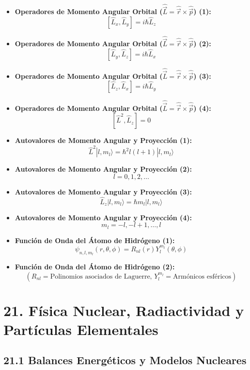 \documentclass[11pt,a4paper]{article}
\begin{document}
\begin{itemize}
  \item \textbf{Operadores de Momento Angular Orbital ($\hat{\vec{L}} = \hat{\vec{r}} \times \hat{\vec{p}}$) (1):}
  \[
    [\hat{L}_x, \hat{L}_y] = i\hbar \hat{L}_z
  \]
  \item \textbf{Operadores de Momento Angular Orbital ($\hat{\vec{L}} = \hat{\vec{r}} \times \hat{\vec{p}}$) (2):}
  \[
    [\hat{L}_y, \hat{L}_z] = i\hbar \hat{L}_x
  \]
  \item \textbf{Operadores de Momento Angular Orbital ($\hat{\vec{L}} = \hat{\vec{r}} \times \hat{\vec{p}}$) (3):}
  \[
    [\hat{L}_z, \hat{L}_x] = i\hbar \hat{L}_y
  \]
  \item \textbf{Operadores de Momento Angular Orbital ($\hat{\vec{L}} = \hat{\vec{r}} \times \hat{\vec{p}}$) (4):}
  \[
    [\hat{L}^2, \hat{L}_z] = 0
  \]
  \item \textbf{Autovalores de Momento Angular y Proyección (1):}
  \[
    \hat{L}^2 |l, m_l\rangle = \hbar^2 l(l + 1)|l, m_l\rangle
  \]
  \item \textbf{Autovalores de Momento Angular y Proyección (2):}
  \[
    l = 0, 1, 2, \dots
  \]
  \item \textbf{Autovalores de Momento Angular y Proyección (3):}
  \[
    \hat{L}_z |l, m_l\rangle = \hbar m_l |l, m_l\rangle
  \]
  \item \textbf{Autovalores de Momento Angular y Proyección (4):}
  \[
    m_l = -l, -l+1, \dots, l
  \]
  \item \textbf{Función de Onda del Átomo de Hidrógeno (1):}
  \[
    \psi_{n, l, m_l}(r, \theta, \phi) = R_{nl}(r) Y_l^{m_l}(\theta, \phi)
  \]
  \item \textbf{Función de Onda del Átomo de Hidrógeno (2):}
  \[
    (R_{nl} = \text{Polinomios asociados de Laguerre}, \, Y_l^{m_l} = \text{Armónicos esféricos})
  \]
\end{itemize}

\section*{21. Física Nuclear, Radiactividad y Partículas Elementales}

\subsection*{21.1 Balances Energéticos y Modelos Nucleares}
\end{document}
